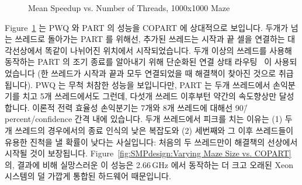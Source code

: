 \begin{figure}[tb]
\centering
{}
\caption{Mean Speedup vs. Number of Threads, 1000x1000 Maze}
\label{fig:SMPdesign:Mean Speedup vs. Number of Threads, 1000x1000 Maze}
\end{figure}

Figure~\ref{fig:SMPdesign:Mean Speedup vs. Number of Threads, 1000x1000 Maze}
는 PWQ 와 PART 의 성능을 COPART 에 상대적으로 보입니다.
두개가 넘는 쓰레드로 돌아가는 PART 를 위해선, 추가된 쓰레드는 시작과 끝 셀을
연결하는 대각선상에서 똑같이 나뉘어진 위치에서 시작되었습니다.
두개 이상의 쓰레드를 사용해 동작하는 PART 의 조기 종료를 알아내기 위해 단순화된
연결 상태 라우팅~\cite{BERT-87} 이 사용되었습니다 (한 쓰레드가 시작과 끝과 모두
연결되었을 때 해결책이 찾아진 것으로 취급됩니다).
PWQ 는 무척 처참한 성능을 보입니다만, PART 는 두개 쓰레드에서 손익분기를 치고
5개 쓰레드에서도 그런데, 다섯개 쓰레드 이후부턴 약간의 속도향상만 달성합니다.
이론적 전력 효율성 손익분기는 7개와 8개 쓰레드에 대해선
90\=/percent\-/confidence 간격 내에 있습니다.
두개 쓰레드에서 피크를 치는 이유는 (1) 두개 쓰레드의 경우에서의 종료 인식의
낮은 복잡도와 (2) 세번째와 그 이후 쓰레드들이 유용한 진척을 낼 확률이 낮다는
사실입니다: 처음의 두 쓰레드만이 해결책의 선상에서 시작될 것이 보장됩니다.
Figure~\ref{fig:SMPdesign:Varying Maze Size vs. COPART}
의, 결과에 비해 실망스러운 이 성능은 2.66\,GHz 에서 동작하는 더 크고 오래된
Xeon 시스템의 덜 가깝게 통합된 하드웨어 때문입니다.

